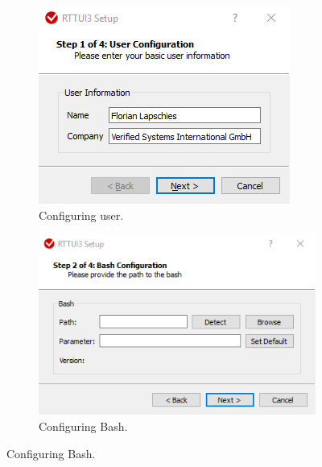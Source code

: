 \begin{figure}[ht]
    \begin{subfigure}{0.4\textwidth}
        \centerline{\includegraphics[scale=0.45]{figures/VSI-Configuration-User}}
        \caption{Configuring user.}
        \label{figure:rtt-mbt.config.user}
    \end{subfigure}
    \begin{subfigure}{0.6\textwidth}
        \centerline{\includegraphics[scale=0.45]{figures/VSI-Configuration-Bash}}
        \caption{Configuring Bash.}
        \label{figure:rtt-mbt.config.bash}
    \end{subfigure}
    

\end{figure}
